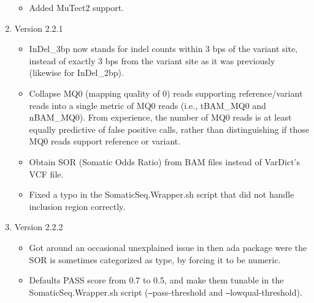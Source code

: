 \documentclass[10pt,letterpaper]{article}
\begin{document}
\begin{sloppypar}
\begin{enumerate}
		\begin{itemize}
		
		  \item
		  Added MuTect2 support.
		
		\end{itemize}
	
	
	
	\item Version 2.2.1
	
		\begin{itemize}
		
		  \item
		  InDel\_3bp now stands for indel counts within 3 bps of the variant site, instead of exactly 3 bps from the variant site as it was previously (likewise for InDel\_2bp). 
		 
		  \item
		  Collapse MQ0 (mapping quality of 0) reads supporting reference/variant reads into a single metric of MQ0 reads (i.e., tBAM\_MQ0 and nBAM\_MQ0). From experience, the number of MQ0 reads is at least equally predictive of false positive calls, rather than distinguishing if those MQ0 reads support reference or variant. 
		  
		  \item
		  Obtain SOR (Somatic Odds Ratio) from BAM files instead of VarDict's VCF file.
		  
		  \item
		  Fixed a typo in the SomaticSeq.Wrapper.sh script that did not handle inclusion region correctly.
		  
		\end{itemize}
	
	
	
	\item Version 2.2.2
	
		\begin{itemize}
		
		  \item
		  Got around an occasional unexplained issue in then ada package were the SOR is sometimes categorized as type, by forcing it to be numeric. 
		  
		  \item
		  Defaults PASS score from 0.7 to 0.5, and make them tunable in the SomaticSeq.Wrapper.sh script (\texttt{--}pass-threshold and \texttt{--}lowqual-threshold). 
		  
		\end{itemize}
	
	
	

\end{enumerate}
\end{sloppypar}
\end{document}
